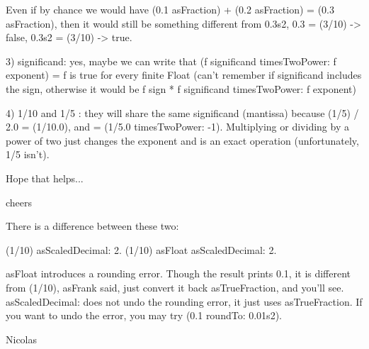 \documentclass[a4paper,10pt,twoside]{book}
\begin{document}
Even if by chance we would have  (0.1 asFraction) + (0.2 asFraction) =
(0.3 asFraction), then it would still be something different from
0.3s2, 0.3 = (3/10) -> false, 0.3s2 = (3/10) -> true.

3) significand: yes, maybe we can write that (f significand
timesTwoPower: f exponent) = f is true for every finite Float (can't
remember if significand includes the sign, otherwise it would be f
sign * f significand timesTwoPower: f exponent)

4) 1/10 and 1/5 : they will share the same significand (mantissa)
because (1/5) / 2.0 = (1/10.0), and = (1/5.0 timesTwoPower: -1).
Multiplying or dividing by a power of two just changes the exponent
and is an exact operation (unfortunately, 1/5 isn't).

Hope that helps...

cheers

There is a difference between these two:

(1/10) asScaledDecimal: 2.
(1/10) asFloat asScaledDecimal: 2.

asFloat introduces a rounding error.
Though the result prints 0.1, it is different from (1/10), asFrank
said, just convert it back asTrueFraction, and you'll see.
asScaledDecimal: does not undo the rounding error, it just uses asTrueFraction.
If you want to undo the error, you may try (0.1 roundTo: 0.01s2).

Nicolas

\ifx\wholebook\relax\else
   
   
\end{document}
